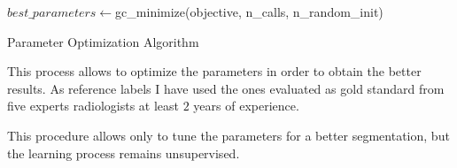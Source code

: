 \documentclass{standalone}
\begin{document}
	
	\begin{algorithm}[h!]
	
		\SetAlgoLined
		\DontPrintSemicolon
		
		
			
		
		
		$best\_parameters\leftarrow$gc\_minimize(objective, n\_calls, n\_random\_init)\;
		
			\caption{Parameter Optimization Algorithm}\label{alg:optimize}
	\end{algorithm}
		
		
	This process allows to optimize the parameters in order to obtain the better results. As reference labels I have used the ones evaluated as gold standard from five experts radiologists at least $2$ years of experience.
	
	This procedure allows only to tune the parameters for a better segmentation, but the learning process remains unsupervised.
\end{document}

